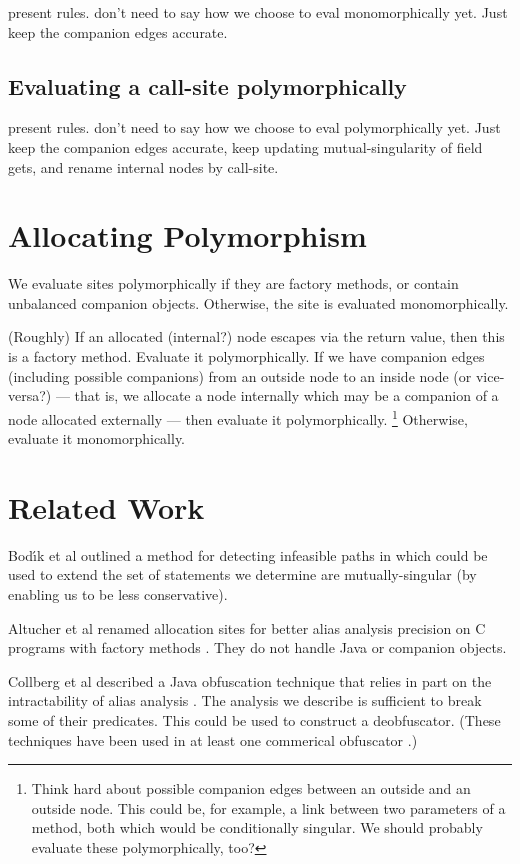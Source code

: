 \documentclass[11pt,notitlepage]{article}
\begin{document}
present rules.  don't need to say how we choose to eval
monomorphically yet.  Just keep the companion edges accurate.

\subsection{Evaluating a call-site polymorphically}

present rules.  don't need to say how we choose to eval
polymorphically yet.  Just keep the companion edges accurate,
keep updating mutual-singularity of field gets,
and rename internal nodes by call-site.

\section{Allocating Polymorphism}

We evaluate sites polymorphically if they are factory methods, or
contain unbalanced companion objects.  Otherwise, the site is
evaluated monomorphically.

(Roughly) If an allocated (internal?) node escapes via the return
value, then this is a factory method.  Evaluate it polymorphically.
If we have companion edges (including possible companions) from
an outside node to an inside node (or vice-versa?) --- that is, we
allocate a node internally which may be a companion of a node allocated
externally --- then evaluate it polymorphically.%
\footnote{Think hard about possible companion edges between an
outside and an outside node.  This could be, for example, a
link between two parameters of a method, both which would be
conditionally singular.  We should probably evaluate these
polymorphically, too?}
Otherwise, evaluate it monomorphically.

\section{Related Work}

Bod{\'\i}k et al outlined a method for detecting infeasible paths
in \cite{267921} which could be used to extend the set of statements
we determine are mutually-singular (by enabling us to be less conservative).

Altucher et al renamed allocation sites for better alias analysis
precision on C programs with factory methods \cite{199466}.  They
do not handle Java or companion objects.

Collberg et al described a Java obfuscation technique that relies in
part on the intractability of alias analysis \cite{268962}.  The
analysis we describe is sufficient to break some of their predicates.
This could be used to construct a deobfuscator.  (These techniques
have been used in at least one commerical obfuscator \cite{humper02}.)



\end{document}
